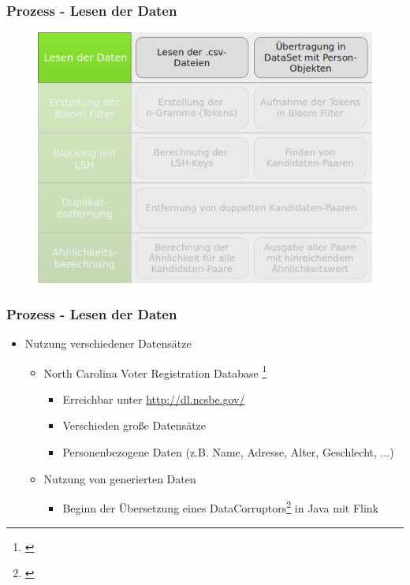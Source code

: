 \documentclass{beamer}
\begin{document}
    \begin{frame}
    		\frametitle{Prozess - Lesen der Daten}
    		\begin{figure}[H]
    			\includegraphics[width=\textwidth]{graphics/process_1.png}
    		\end{figure}
    \end{frame}
    
    \begin{frame}
    		\frametitle{Prozess - Lesen der Daten}
    		\begin{itemize}
    			\item Nutzung verschiedener Datensätze
    			\begin{itemize}
    				\item North Carolina Voter Registration Database
    					\footnote{\cite{NorthCarolinaVoterRegistration}}
    				\begin{itemize}
    					\item Erreichbar unter \url{http://dl.ncsbe.gov/}
    					\item Verschieden große Datensätze
    					\item Personenbezogene Daten (z.B. Name, Adresse, Alter, Geschlecht, ...)
    				\end{itemize}
    				\item Nutzung von generierten Daten
    				\begin{itemize}
    					\item Beginn der Übersetzung eines DataCorruptors\footnote{\cite{DataCorruptor}} in Java mit Flink 
    				\end{itemize}	
    			\end{itemize} 
    		\end{itemize}
    \end{frame}
    
\end{document}
